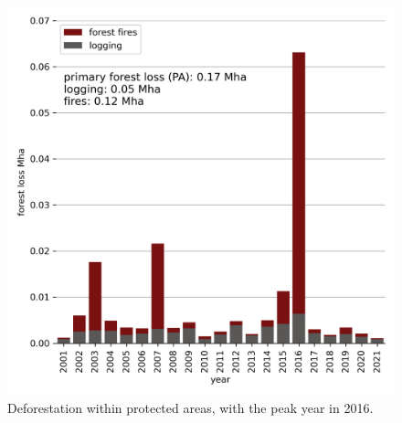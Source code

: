 \documentclass[
  letterpaper,
  DIV=11,
  numbers=noendperiod]{scrreprt}
\begin{document}
\begin{figure}[H]
\begin{minipage}[t]{0.49\linewidth}
{{\includegraphics{text/../code/results/final_plots/deforestation_primary_forest_protected_areas.png}

}

}

\end{minipage}%

\caption{\label{fig-forestlossbarcharts_PA}Deforestation within
protected areas, with the peak year in 2016.}

\end{figure}
\end{document}
